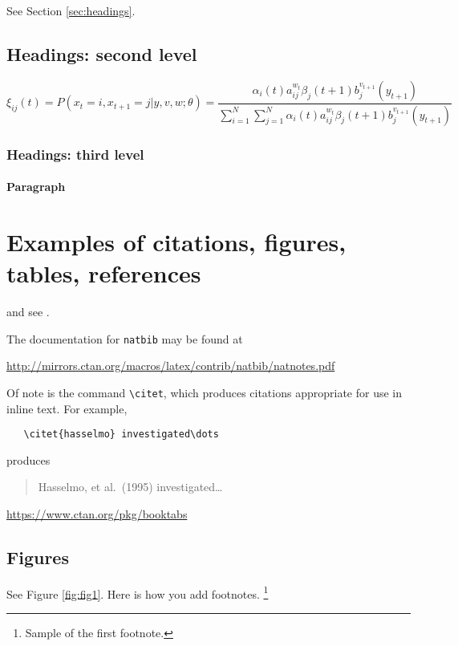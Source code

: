 \documentclass{article}
\begin{document}
  \lipsum[4] See Section \ref{sec:headings}.

  \subsection{Headings: second level}
  \lipsum[5]
  \begin{equation}
    \xi _{ij}(t)=P(x_{t}=i,x_{t+1}=j|y,v,w;\theta)= {\frac {\alpha _{i}(t)a^{w_t}_{ij}\beta _{j}(t+1)b^{v_{t+1}}_{j}(y_{t+1})}{\sum _{i=1}^{N} \sum _{j=1}^{N} \alpha _{i}(t)a^{w_t}_{ij}\beta _{j}(t+1)b^{v_{t+1}}_{j}(y_{t+1})}}
  \end{equation}

  \subsubsection{Headings: third level}
  \lipsum[6]

  \paragraph{Paragraph}
  \lipsum[7]


  \section{Examples of citations, figures, tables, references}
  \label{sec:others}
  \lipsum[8] \cite{kour2014real,kour2014fast} and see \cite{hadash2018estimate}.

  The documentation for \verb+natbib+ may be found at
  \begin{center}
    \url{http://mirrors.ctan.org/macros/latex/contrib/natbib/natnotes.pdf}
  \end{center}
  Of note is the command \verb+\citet+, which produces citations
  appropriate for use in inline text. For example,
  \begin{verbatim}
   \citet{hasselmo} investigated\dots
  \end{verbatim}
  produces
  \begin{quote}
    Hasselmo, et al.\ (1995) investigated\dots
  \end{quote}

  \begin{center}
    \url{https://www.ctan.org/pkg/booktabs}
  \end{center}

  \subsection{Figures}
  \lipsum[10]
  See Figure \ref{fig:fig1}. Here is how you add footnotes. \footnote{Sample of the first footnote.}
  \lipsum[11]
\end{document}
